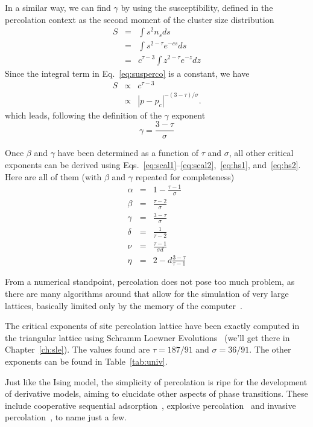 In a similar way, we can find $\gamma$ by using the susceptibility, defined in
the percolation context as the second moment of the cluster size distribution
\begin{eqnarray}
    S & = & \int s^{2}n_{s}ds\\
      & = & \int s^{2-\tau}e^{-cs}ds\\
      & = & c^{\tau-3}\int z^{2-\tau}e^{-z}dz
    \label{eq:susperco}
\end{eqnarray}
Since the integral term in Eq.~\ref{eq:susperco} is a constant, we have
\begin{eqnarray}
 S & \propto & c^{\tau-3}\\
 & \propto & \left|p-p_{c}\right|^{-\left(3-\tau\right)/\sigma}.
\end{eqnarray}
which leads, following the definition of the $\gamma$ exponent
\begin{equation}
    \gamma=\frac{3-\tau}{\sigma}
\end{equation}

Once $\beta$ and $\gamma$ have been determined as a function of $\tau$ and
$\sigma$, all other critical exponents can be derived using
Eqs.~\ref{eq:scal1}--\ref{eq:scal2},~\ref{eq:hs1}, and~\ref{eq:hs2}. Here
are all of them (with $\beta$ and $\gamma$ repeated for completeness)
\begin{eqnarray}
    \alpha & = & 1-\frac{\tau-1}{\sigma}\\
    \beta  & = & \frac{\tau-2}{\sigma}\\
    \gamma & = & \frac{3-\tau}{\sigma}\\
    \delta & = & \frac{1}{\tau-2}\\
    \nu    & = & \frac{\tau-1}{\sigma d}\\
    \eta   & = & 2-d\frac{3-\tau}{\tau-1}
\end{eqnarray}

From a numerical standpoint, percolation does not pose too much problem, as
there are many algorithms around that allow for the simulation of very large
lattices, basically limited only by the memory of the
computer~\cite{Newman2000}.

The critical exponents of site percolation lattice have been exactly computed
in the triangular lattice using Schramm Loewner Evolutions~\cite{Smirnov2001}
(we'll get there in Chapter~\ref{ch:sle}). The values found are $\tau=187/91$
and $\sigma=36/91$. The other exponents can be found in Table~\ref{tab:univ}.

Just like the Ising model, the simplicity of percolation is ripe for the
development of derivative models, aiming to elucidate other aspects of phase
transitions. These include cooperative sequential adsorption~\cite{Araujo2013},
explosive percolation~\cite{Achlioptas2009} and invasive
percolation~\cite{Wilkinson1983}, to name just a few.

